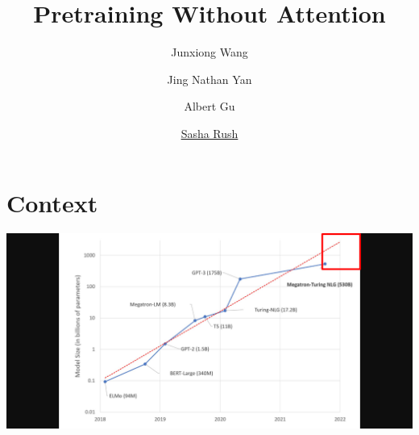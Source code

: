\documentclass[14pt,aspectratio=169]{beamer}
\title{Pretraining Without Attention}
\author{Junxiong Wang  \and Jing Nathan Yan  \and Albert Gu  \and \underline{Sasha Rush} \inst{*}}
\institute[shortinst]{\inst{*} Preprint}
\begin{document}
{
  \begin{frame}
    \titlepage
  \end{frame}
}





\section{Context}
\begin{frame}
    \includegraphics[trim={10cm 0 10cm 0}, clip, height=\textheight]{Figs/ModelSize2.png}
\end{frame}
\end{document}

